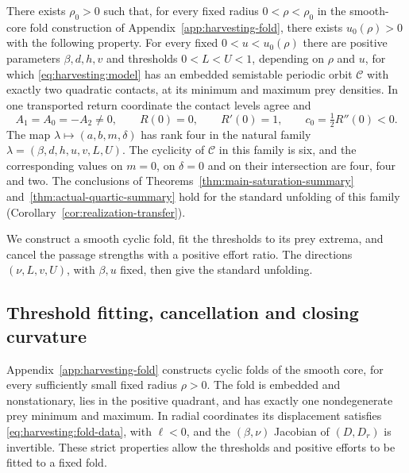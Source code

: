 \begin{theorem}
\label{thm:harvesting-realization}
There exists \(\rho_0>0\) such that, for every fixed radius
\(0<\rho<\rho_0\) in the smooth-core fold construction of
Appendix~\ref{app:harvesting-fold}, there exists \(u_0(\rho)>0\) with the following
property. For every fixed \(0<u<u_0(\rho)\) there are positive parameters
\(\beta,d,h,v\) and thresholds \(0<L<U<1\), depending on \(\rho\) and \(u\),
for which \eqref{eq:harvesting:model} has an embedded semistable periodic
orbit \(\mathcal C\) with exactly two quadratic contacts, at its minimum and
maximum prey densities. In one transported return coordinate the contact
levels agree and
\[
 A_1=A_0=-A_2\ne0,\qquad
 R(0)=0,\qquad R'(0)=1,\qquad c_0=\tfrac12R''(0)<0.
\]
The map \(\lambda\mapsto(a,b,m,\delta)\) has rank four in the natural
family \(\lambda=(\beta,d,h,u,v,L,U)\). The cyclicity of \(\mathcal C\) in
this family is six, and the corresponding values on \(m=0\), on
\(\delta=0\) and on their intersection are four, four and two. The
conclusions of Theorems~\ref{thm:main-saturation-summary}
and~\ref{thm:actual-quartic-summary} hold for the standard unfolding of this
family (Corollary~\ref{cor:realization-transfer}).
\end{theorem}

We construct a smooth cyclic fold, fit the thresholds to its prey
extrema, and cancel the passage strengths with a positive effort
ratio. The directions \((\nu,L,v,U)\), with \(\beta,u\) fixed,
then give the standard unfolding.

\subsection{Threshold fitting, cancellation and closing curvature}

Appendix~\ref{app:harvesting-fold} constructs cyclic folds of
the smooth core, for every sufficiently small fixed radius \(\rho>0\).
The fold is embedded and nonstationary, lies in the positive quadrant,
and has exactly one nondegenerate prey minimum and maximum. In radial
coordinates its displacement satisfies
\eqref{eq:harvesting:fold-data}, with \(\ell<0\), and the
\((\beta,\nu)\) Jacobian of \((D,D_r)\) is invertible.
These strict properties allow the thresholds and positive efforts to be
fitted to a fixed fold.

